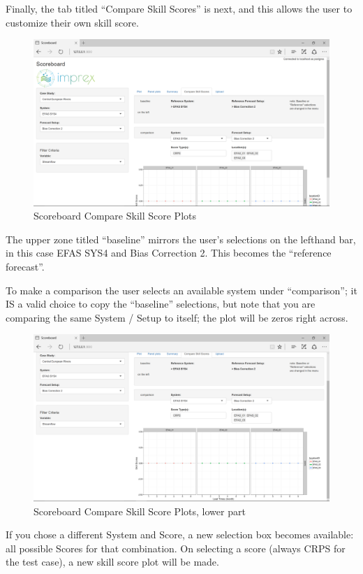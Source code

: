 \documentclass[logos,parttoc,morelanguage=french,morelanguage=german,draft]{orsay-memoire}
\begin{document}
Finally, the tab titled ``Compare Skill Scores'' is next, and this allows the user to customize their own skill score.

\begin{figure}[H]
\centering
\includegraphics[width=0.80\linewidth]{images/isb4.png}
  \caption{Scoreboard Compare Skill Score Plots}
  \label{fig:isb4}
\end{figure}


The upper zone titled ``baseline'' mirrors the user's selections on the lefthand bar, in this case EFAS SYS4 and Bias Correction 2. This becomes the ``reference forecast''.

To make a comparison the user selects an available system under ``comparison''; it IS a valid choice to copy the ``baseline'' selections, but note that you are comparing the same System / Setup to itself; the plot will be zeros right across.

\begin{figure}[H]
\centering
\includegraphics[width=0.85\linewidth]{images/isb5.png}
  \caption{Scoreboard Compare Skill Score Plots, lower part}
  \label{fig:isb5}
\end{figure}

If you chose a different System and Score, a new selection box becomes available: all possible Scores for that combination. On selecting a score (always CRPS for the test case), a new skill score plot will be made.
\end{document}
